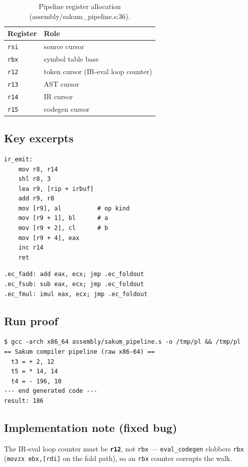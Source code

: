 \begin{table}[H]
\centering
\begin{tabularx}{\textwidth}{lX}
\toprule
Register & Role \\
\midrule
\texttt{rsi} & source cursor \\
\texttt{rbx} & symbol table base \\
\texttt{r12} & token cursor (IR-eval loop counter) \\
\texttt{r13} & AST cursor \\
\texttt{r14} & IR cursor \\
\texttt{r15} & codegen cursor \\
\bottomrule
\end{tabularx}
\caption{Pipeline register allocation (assembly/sakum\_pipeline.s:36).}
\end{table}

\subsection{Key excerpts}

\begin{lstlisting}[language=SakumAsm,caption={IR emit of a three-address instruction (sakum\_pipeline.s:404).}]
ir_emit:
    mov r8, r14
    shl r8, 3
    lea r9, [rip + irbuf]
    add r9, r8
    mov [r9], al          # op kind
    mov [r9 + 1], bl      # a
    mov [r9 + 2], cl      # b
    mov [r9 + 4], eax
    inc r14
    ret
\end{lstlisting}

\begin{lstlisting}[language=SakumAsm,caption={Constant-folded binary op (eval\_codegen, sakum\_pipeline.s:498).}]
.ec_fadd: add eax, ecx; jmp .ec_foldout
.ec_fsub: sub eax, ecx; jmp .ec_foldout
.ec_fmul: imul eax, ecx; jmp .ec_foldout
\end{lstlisting}

\subsection{Run proof}

\begin{verbatim}
$ gcc -arch x86_64 assembly/sakum_pipeline.s -o /tmp/pl && /tmp/pl
== Sakum compiler pipeline (raw x86-64) ==
  t3 = + 2, 12
  t5 = * 14, 14
  t4 = - 196, 10
--- end generated code ---
result: 186
\end{verbatim}

\subsection{Implementation note (fixed bug)}

The IR-eval loop counter must be \textbf{\texttt{r12}}, not \texttt{rbx} ---
\texttt{eval\_codegen} clobbers \texttt{rbx} (\texttt{movzx ebx,[rdi]} on
the fold path), so an \texttt{rbx} counter corrupts the walk.
